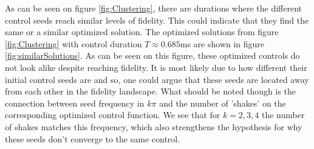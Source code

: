 \documentclass[aps,pra,reprint,superscriptaddress]{revtex4-1}
\begin{document}
As can be seen on figure \ref{fig:Clustering}, there are durations where the different control seeds reach similar levels of fidelity. This could indicate that they find the same or a similar optimized solution. The optimized solutions from figure \ref{fig:Clustering} with control duration $T\approx 0.685$ms are shown in figure \ref{fig:similarSolutions}. As can be seen on this figure, these optimized controls do not look alike despite reaching fidelity. It is most likely due to how different their initial control seeds are and so, one could argue that these seeds are located away from each other in the fidelity landscape. What should be noted though is the connection between seed frequency in $k\pi$ and the number of 'shakes' on the corresponding optimized control function. We see that for $k=2,3,4$ the number of shakes matches this frequency, which also strengthens the hypothesis for why these seeds don't converge to the same control. \\
\end{document}
